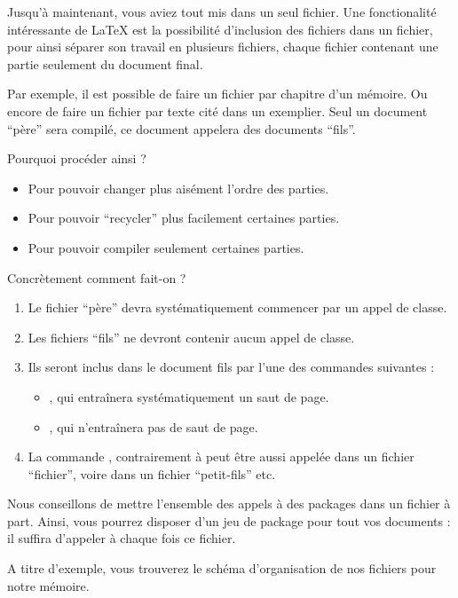 Jusqu'à maintenant, vous aviez tout mis dans un seul fichier. Une fonctionalité intéressante de \LaTeX{} est la possibilité d'inclusion des fichiers dans un fichier, pour ainsi séparer son travail en plusieurs fichiers, chaque fichier contenant une partie seulement du document final.

Par exemple, il est possible de faire un fichier par chapitre d'un mémoire. Ou encore de faire un fichier par texte cité dans un exemplier. Seul un document \enquote{père} sera compilé, ce document appelera des documents \enquote{fils}.

Pourquoi procéder ainsi ?
\begin{itemize}
\item Pour pouvoir changer plus aisément l'ordre des parties. 
\item Pour pouvoir \enquote{recycler} plus facilement certaines parties.
\item Pour pouvoir compiler seulement certaines parties.
\end{itemize}

Concrètement comment fait-on ?
\begin{enumerate}
\item Le fichier \enquote{père} devra systématiquement commencer par un appel de classe.
\item Les fichiers \enquote{fils} ne devront contenir aucun appel de classe.
\item Ils seront inclus dans le document fils par l'une des commandes suivantes :
\begin{itemize}
	\item \verb||, qui entraînera systématiquement un saut de page.
	\item \verb||, qui n'entraînera pas de saut de page.
\end{itemize}
\item La commande , contrairement à  peut être aussi appelée dans un fichier \enquote{fichier}, voire dans un fichier \enquote{petit-fils} etc.

\end{enumerate}

Nous conseillons de mettre l'ensemble des appels à des packages dans un fichier à part. Ainsi, vous pourrez disposer d'un jeu de package pour tout vos documents : il suffira d'appeler à chaque fois ce fichier.

A titre d'exemple, vous trouverez le schéma d'organisation de nos fichiers pour notre mémoire.

